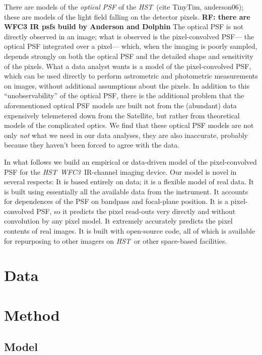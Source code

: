 \documentclass[12pt,letterpaper,preprint]{aastex}
\newcommand{\instrument}[1]{\textsl{#1}}
\newcommand{\rf}[1]{\textbf{RF: #1}}
\newcommand{\HST}{\instrument{HST}}
\newcommand{\WFC}{\instrument{WFC3}}
\begin{document}
There are models of the \emph{optical PSF} of the \HST\ (cite TinyTim, anderson06);
  these are models of the light field falling on the detector pixels. \rf{there are WFC3 IR psfs build by Anderson and Dolphin}
The optical PSF is not directly observed in an image;
  what is observed is the pixel-convolved PSF---%
  the optical PSF integrated over a pixel---%
  which, when the imaging is poorly sampled,
  depends strongly on both the optical PSF
  and the detailed shape and sensitivity of the pixels.
What a data analyst wants is a model of the pixel-convolved PSF,
  which can be used directly to perform astrometric and photometric measurements on images,
  without additional assumptions about the pixels.
In addition to this ``unobservability'' of the optical PSF,
  there is the additional problem that the aforementioned optical PSF models
  are built not from the (abundant) data expensively telemetered down from the Satellite,
  but rather from theoretical models of the complicated optics.
We find that these optical PSF models are not only \emph{not} what we need in our data analyses,
  they are also inaccurate, probably because they haven't been forced to agree with the data.

In what follows we build an empirical or data-driven model
  of the pixel-convolved PSF for the \HST\ \WFC\ IR-channel imaging device.
Our model is novel in several respects:
It is based entirely on data;
  it is a flexible model of real data.
It is built using essentially all the available data from the instrument.
It accounts for dependences of the PSF on bandpass and focal-plane position.
It is a pixel-convolved PSF,
  so it predicts the pixel read-outs very directly and without convolution by any pixel model.
It extremely accurately predicts the pixel contents of real images.
It is built with open-source code,
  all of which is available for repurposing to other imagers on \HST\ or other space-based facilities.

\section{Data}

\section{Method}

\subsection{Model}
\end{document}
